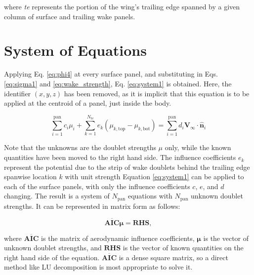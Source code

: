 \documentclass[11pt]{article}
\begin{document}
\noindent where \emph{te} represents the portion of the wing's trailing edge
spanned by a given column of surface and trailing wake panels.

\section{System of Equations}

Applying Eq. \ref{eq:phi4} at every surface panel, and substituting in Eqs.
\ref{eq:sigma1} and \ref{eq:wake_strength}, Eq. \ref{eq:system1} is obtained.
Here, the identifier $(x,y,z)$ has been removed, as it is implicit that this equation is
to be applied at the centroid of a panel, just inside the body.

\begin{equation}
  \sum_{i=1}^{\text{pan}}c_i\mu_i 
+ \sum_{k=1}^{N_\text{te}}e_k\left(\mu_{k,\text{top}} - \mu_{k,\text{bot}}\right)
= \sum_{i=1}^{\text{pan}}d_i\mathbf{V}_\infty\cdot\mathbf{\hat{n}}_i
\label{eq:system1}
\end{equation}

\noindent Note that the unknowns are the doublet strengths $\mu$ only, while the
known quantities have been moved to the right hand side. The influence
coefficients $e_k$ represent the potential due to the strip of wake doublets
behind the trailing edge spanwise location $k$ with unit strength
Equation \ref{eq:system1} can be
applied to each of the surface panels, with only the influence coefficients
$c$, $e$, and $d$ changing. The result is a system of
$N_{\text{pan}}$ equations with $N_{\text{pan}}$ unknown doublet strengths. It
can be represented in matrix form as follows:

\begin{equation}
\mathbf{\overline{AIC}}\boldsymbol{\mu} = \mathbf{RHS},
\label{eq:system2}
\end{equation}

\noindent where $\mathbf{\overline{AIC}}$ is the matrix of aerodynamic influence
coefficients,
$\boldsymbol{\mu}$ is the vector of unknown doublet strengths, and $\mathbf{RHS}$ is the
vector of known quantities on the right hand side of the equation. $\mathbf{\overline{AIC}}$
is a
dense square matrix, so a direct method like LU decomposition is most appropriate to solve
it.
\end{document}
